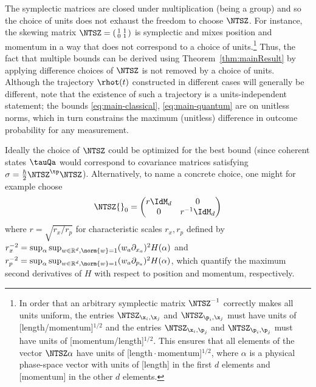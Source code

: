 \documentclass{article}
\numberwithin{equation}{section}
\begin{document}
The symplectic matrices are closed under multiplication (being a group) and so the choice of units does not exhaust the freedom to choose $\NTSZ$.  For instance, the skewing matrix $\NTSZ=\left(\begin{smallmatrix}1 & 1\\0&1\end{smallmatrix}\right)$ is symplectic and mixes position and momentum in a way that does not correspond to a choice of units.\footnote{In order that an arbitrary symplectic matrix $\NTSZ^{-1}$ correctly makes all units uniform, the entries $\NTSZ_{\x_i,\x_j}$ and $\NTSZ_{\p_i,\x_j}$ must have units of [length/momentum]${}^{1/2}$ and the entries $\NTSZ_{\x_i,\p_j}$ and $\NTSZ_{\p_i,\p_j}$ must have units of [momentum/length]${}^{1/2}$.  This ensures that all elements of the vector $\NTSZ\alpha$ have units of [length\,$\cdot$\,momentum]${}^{1/2}$, where $\alpha$ is a physical phase-space vector with units of [length] in the first $d$ elements and [momentum] in the other $d$ elements.}
Thus, the fact that multiple bounds can be derived using Theorem~\ref{thm:mainResult} by applying difference choices of $\NTSZ$ is not removed by a choice of units.
Although the trajectory $\rhot(t)$ constructed in different cases will generally be different, note that the existence of such a trajectory is a units-independent statement; the bounds \eqref{eq:main-classical}, \eqref{eq:main-quantum} are on unitless norms, which in turn constrains the maximum (unitless) difference in outcome probability for any measurement.









Ideally the choice of $\NTSZ$ could be optimized for the best bound
(since coherent states $\tauQa$ would correspond to covariance matrices satisfying 
$\sigma = \frac{\hbar}{2} \NTSZ^\tp \NTSZ$).  Alternatively, to name a concrete choice, one might for example choose
\begin{equation} \label{eq:Z0}
    \begin{split}
        \NTSZ{}_0 = \left(\begin{matrix} r\IdM_d & 0 \\0 & r^{-1}\IdM_d\end{matrix}\right)
    \end{split}
\end{equation}
where $r=\sqrt{r_x/r_p}$ for characteristic scales $r_x, r_p$ defined by $r_x^{-2} = \sup_\alpha \sup_{w \in \mathbb{R}^d, \norm{w}=1} (w_a \partial_{x_a})^2 H(\alpha)$ and $r_p^{-2} = \sup_\alpha \sup_{w \in \mathbb{R}^d, \norm{w}=1} (w_a \partial_{p_a})^2 H(\alpha)$, which quantify the maximum second derivatives of $H$ with respect to position and momentum, respectively.  
\end{document}
